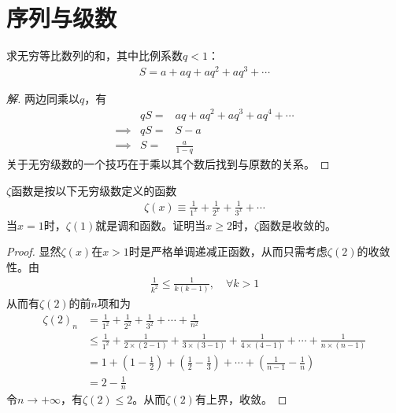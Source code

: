 
\chapter{序列与级数}
\label{chap:series}

\begin{example}[等比数列]
  求无穷等比数列的和，其中比例系数$q<1$：
  \begin{align*}
    S=a + aq + aq^2 + aq^3 + \cdots
  \end{align*}
\end{example}
\begin{proof}[解]
  两边同乘以$q$，有
  \begin{eqnarray*}
            & qS=& aq + aq^2 + aq^3 + aq^4 + \cdots\\
    \implies& qS=& S - a\\
    \implies&  S=& \frac{a}{1-q}
  \end{eqnarray*}
  关于无穷级数的一个技巧在于乘以其个数后找到与原数的关系。
\end{proof}

\begin{example}[$\zeta$函数]
  $\zeta$函数是按以下无穷级数定义的函数
  \begin{align}
    \zeta(x)\equiv \frac1{1^x} + \frac1{2^x} + \frac1{3^x} + \cdots
  \end{align}
  当$x=1$时，$\zeta(1)$就是调和函数。证明当$x\ge2$时，$\zeta$函数是收敛的。
\end{example}
\begin{proof}
  显然$\zeta(x)$在$x>1$时是严格单调递减正函数，从而只需考虑$\zeta(2)$的收敛性。由
  \begin{align*}
    \frac1{k^2} \le \frac1{k(k-1)},\quad\forall k>1
  \end{align*}
  从而有$\zeta(2)$的前$n$项和为
  \begin{align*}
    \zeta(2)_n&=\frac1{1^2} + \frac1{2^2} + \frac1{3^2} + \cdots + \frac1{n^2}\\
            &\le \frac1{1^2} + \frac1{2\times(2-1)} + \frac1{3\times(3-1)} +\frac1{4\times(4-1)}+ \cdots + \frac1{n\times(n-1)}\\
            &= 1 + \left(1 - \frac12\right) + \left(\frac12 - \frac13\right) + \cdots + \left(\frac1{n-1}-\frac1n\right)\\
            &= 2 - \frac1n
  \end{align*}
  令$n\to+\infty$，有$\zeta(2)\le2$。从而$\zeta(2)$有上界，收敛。
\end{proof}

